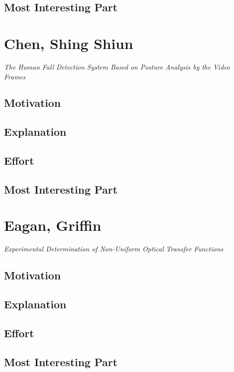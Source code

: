 \documentclass[12pt]{article}
\begin{document}
\subsection{Most Interesting Part}

\newpage
\section{Chen, Shing Shiun}

\textit{The Human Fall Detection System Based on Posture Analysis by the Video Frames}

\subsection{Motivation}

\subsection{Explanation}

\subsection{Effort}

\subsection{Most Interesting Part}

\newpage
\section{Eagan, Griffin}

\textit{Experimental Determination of Non-Uniform Optical Transfer Functions}

\subsection{Motivation}

\subsection{Explanation}

\subsection{Effort}

\subsection{Most Interesting Part}
\end{document}
